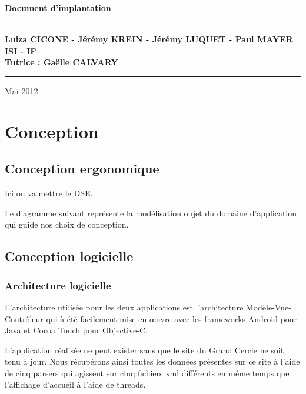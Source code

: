 \documentclass[a4paper, 11px]{article}
\begin{document}
\begin{titlepage}
\begin{center}
\begin{center}
{\Huge \bf Document d'implantation}


\end{center}


\vspace{1cm}

\begin{center}
$ $\\
\large{ \textbf{Luiza CICONE - Jérémy KREIN - Jérémy LUQUET - Paul MAYER}}\\
\large{ \textbf{ISI - IF}}\\
\large{ \textbf{Tutrice : Gaëlle CALVARY}}
$ $\\
\end{center}
\rule{\linewidth}{.5pt}


\vfill


{\large Mai 2012}

\end{center}
\end{titlepage}

\tableofcontents

\newpage
\section {Conception}
\subsection{Conception ergonomique}

	Ici on va mettre le DSE.

Le diagramme suivant représente la modélisation objet du domaine d'application qui guide nos choix de conception.

\subsection{Conception logicielle}

\subsubsection{Architecture logicielle}
L'architecture utilisée pour les deux applications est l'architecture Modèle-Vue-Contrôleur qui à été facilement mise en œuvre avec les frameworks Android pour Java et Cocoa Touch pour Objective-C.

L'application réalisée ne peut exister sans que le site du Grand Cercle ne soit tenu à jour. Nous récupérons ainsi toutes les données présentes sur ce site à l'aide de cinq parsers qui agissent sur cinq fichiers xml différents en même temps que l'affichage d'accueil à l'aide de threads.\\
\end{document}
